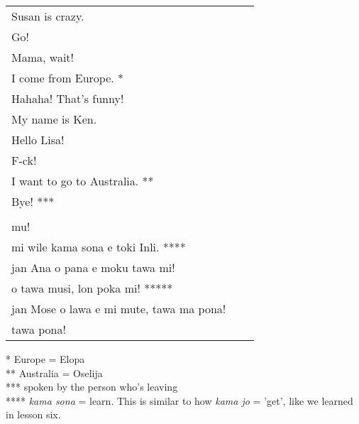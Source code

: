 \begin{supertabular}{p{5,5cm}|ll}
Susan is crazy. &&   \\ %
Go!  &&  \\ %
Mama, wait!  &&  \\ %
I come from Europe. * &&  \\ %
Hahaha! That's funny!  &&  \\ %
My name is Ken. &&  \\  %
Hello Lisa!  && \\  %
F-ck!  &&   \\ %
I want to go to Australia. **  &&  \\  %
Bye! *** &&   \\ %
 && \\ %
mu! &&   \\ %
mi wile kama sona e toki Inli. **** &&  \\ %
jan Ana o pana e moku tawa mi!  &&  \\ %
o tawa musi, lon poka mi! ***** &&  \\ %
jan Mose o lawa e mi mute, tawa ma pona! &&   \\ %
tawa pona!  &&   \\ %
\end{supertabular} 

* Europe = Elopa \\
** Australia = Oselija \\
*** spoken by the person who's leaving \\
****  \textit{kama sona} = learn. This is similar to how \textit{kama jo} = 'get', like we learned in lesson six. \\
